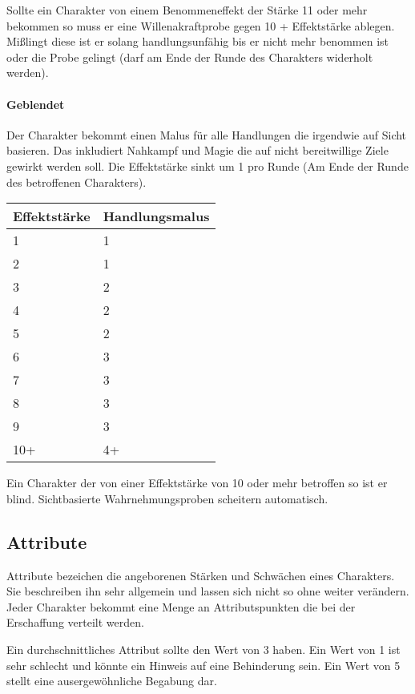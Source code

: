 \documentclass{article}
\begin{document}
Sollte ein Charakter von einem Benommeneffekt der Stärke 11 oder mehr bekommen so muss er eine Willenakraftprobe gegen
10 + Effektstärke ablegen. Mißlingt diese ist er solang handlungsunfähig bis er nicht mehr benommen ist oder die Probe
gelingt (darf am Ende der Runde des Charakters widerholt werden).

\paragraph{Geblendet}

Der Charakter bekommt einen Malus für alle Handlungen die irgendwie auf Sicht basieren. Das inkludiert Nahkampf und
Magie die auf nicht bereitwillige Ziele gewirkt werden soll. Die Effektstärke sinkt um 1 pro Runde (Am Ende der Runde
des betroffenen Charakters).


\begin{small}
\begin{tabular}{|m{2cm}|m{3cm}|}
\hline
\textbf{Effektstärke}&\textbf{Handlungsmalus}\\
\hline
\hline
1&1\\
\hline
2&1\\
\hline
3&2\\
\hline
4&2\\
\hline
5&2\\
\hline
6&3\\
\hline
7&3\\
\hline
8&3\\
\hline
9&3\\
\hline
10+&4+\\
\hline
\end{tabular}
\end{small}

Ein Charakter der von einer Effektstärke von 10 oder mehr betroffen so ist er blind. Sichtbasierte Wahrnehmungsproben
scheitern automatisch.

\begin{center}
\section{Attribute}
\end{center}

Attribute bezeichen die angeborenen Stärken und Schwächen eines Charakters. Sie beschreiben ihn sehr allgemein und
lassen sich nicht so ohne weiter verändern. Jeder Charakter bekommt eine Menge an Attributspunkten die bei der
Erschaffung verteilt werden.

Ein durchschnittliches Attribut sollte den Wert von 3 haben. Ein Wert von 1 ist sehr schlecht und könnte ein Hinweis
auf eine Behinderung sein. Ein Wert von 5 stellt eine ausergewöhnliche Begabung dar.
\end{document}
